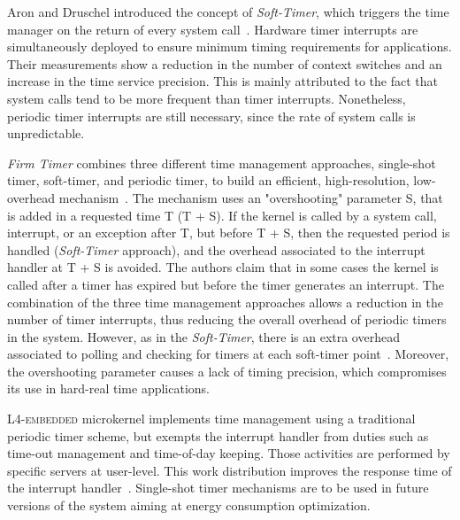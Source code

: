 \documentclass[final,3pd,times]{elsarticle}
\begin{document}
Aron and Druschel introduced the concept of \emph{Soft-Timer}, which
triggers the time manager on the return of every system
call~\cite{Aron:2000}. Hardware timer interrupts are simultaneously
deployed to ensure minimum timing requirements for applications.  Their
measurements show a reduction in the number of context switches and an
increase in the time service precision. This is mainly attributed to the
fact that system calls tend to be more frequent than timer interrupts.
Nonetheless, periodic timer interrupts are still necessary, since the
rate of system calls is unpredictable.

\emph{Firm Timer} combines three different time management approaches,
single-shot timer, soft-timer, and periodic timer, to build an
efficient, high-resolution, low-overhead mechanism~\cite{Goel:2002}. The
mechanism uses an "overshooting" parameter S, that is added in a
requested time T (T + S).  If the kernel is called by a system call,
interrupt, or an exception after T, but before T + S, then the requested
period is handled (\emph{Soft-Timer} approach), and the overhead
associated to the interrupt handler at T + S is avoided. The authors
claim that in some cases the kernel is called after a timer has expired
but before the timer generates an interrupt. The combination of the
three time management approaches allows a reduction in the number of
timer interrupts, thus reducing the overall overhead of periodic timers
in the system. However, as in the \emph{Soft-Timer}, there is an extra
overhead associated to polling and checking for timers at each
soft-timer point~\cite{Goel:2002}. Moreover, the overshooting parameter
causes a lack of timing precision, which compromises its use in
hard-real time applications.

\textsc{L4-embedded} microkernel implements time management using a
traditional periodic timer scheme, but exempts the interrupt handler
from duties such as time-out management and time-of-day keeping. Those
activities are performed by specific servers at user-level. This work
distribution improves the response time of the interrupt
handler~\cite{Ruocco:2008}.  Single-shot timer mechanisms are to be used
in future versions of the system aiming at energy consumption
optimization.
\end{document}
